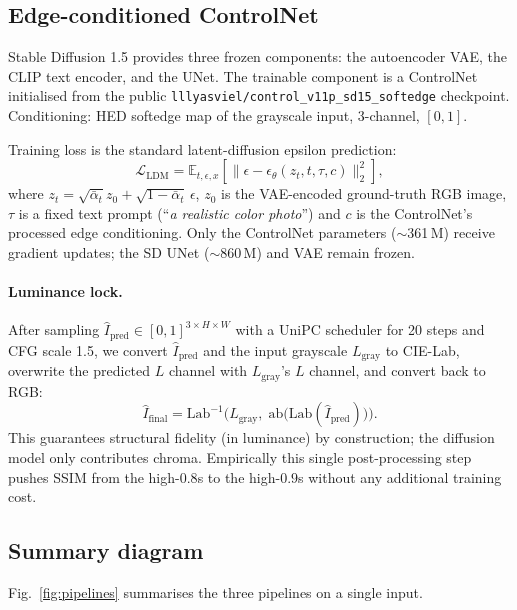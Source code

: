 \documentclass[conference]{IEEEtran}
\begin{document}
\subsection{Edge-conditioned ControlNet}\label{sec:cnet}
Stable Diffusion 1.5 \cite{rombach2022high} provides three frozen
components: the autoencoder VAE, the CLIP text encoder, and the UNet.
The trainable component is a ControlNet \cite{zhang2023adding}
initialised from the public
\texttt{lllyasviel/control\_v11p\_sd15\_softedge} checkpoint.
Conditioning: HED softedge map of the grayscale input,
3-channel, $[0,1]$.

Training loss is the standard latent-diffusion epsilon prediction:
\begin{equation}
  \mathcal{L}_\text{LDM}=\mathbb{E}_{t,\epsilon,x}
    \!\left[\big\|\epsilon - \epsilon_\theta(z_t, t, \tau, c)\big\|_2^2\right],
\end{equation}
where $z_t=\sqrt{\bar\alpha_t}z_0+\sqrt{1-\bar\alpha_t}\,\epsilon$,
$z_0$ is the VAE-encoded ground-truth RGB image, $\tau$ is a fixed
text prompt (``\emph{a realistic color photo}'') and $c$ is the
ControlNet's processed edge conditioning. Only the ControlNet
parameters ($\sim$361\,M) receive gradient updates; the SD UNet
($\sim$860\,M) and VAE remain frozen.

\paragraph{Luminance lock.} After sampling
$\hat{I}_\text{pred}\in[0,1]^{3\times H\times W}$ with a UniPC
scheduler \cite{rombach2022high} for 20 steps and CFG scale 1.5, we
convert $\hat{I}_\text{pred}$ and the input grayscale $L_\text{gray}$
to CIE-Lab, overwrite the predicted $L$ channel with $L_\text{gray}$'s
$L$ channel, and convert back to RGB:
\begin{equation}
  \hat{I}_\text{final} = \text{Lab}^{-1}\!\Big(L_\text{gray},\;
      \mathrm{ab}\big(\text{Lab}(\hat{I}_\text{pred})\big)\Big).
\end{equation}
This guarantees structural fidelity (in luminance) by construction;
the diffusion model only contributes chroma. Empirically this single
post-processing step pushes SSIM from the high-$0.8$s to the
high-$0.9$s without any additional training cost.

\subsection{Summary diagram}\label{sec:diagram}
Fig.~\ref{fig:pipelines} summarises the three pipelines on a single
input.
\end{document}

